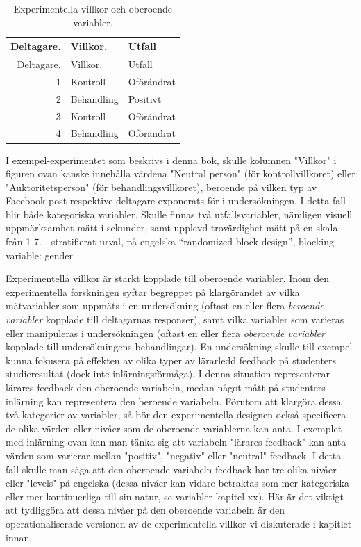 \documentclass[
]{book}
\begin{document}
\begin{longtable}[]{@{}rll@{}}
\caption{\label{tab:tab-02-07-4-2-01}Experimentella villkor och oberoende variabler.}\tabularnewline
\toprule
Deltagare. & Villkor. & Utfall\tabularnewline
\midrule
\endfirsthead
\toprule
Deltagare. & Villkor. & Utfall\tabularnewline
\midrule
\endhead
1 & Kontroll & Oförändrat\tabularnewline
2 & Behandling & Positivt\tabularnewline
3 & Kontroll & Oförändrat\tabularnewline
4 & Behandling & Oförändrat\tabularnewline
\bottomrule
\end{longtable}

I exempel-experimentet som beskrivs i denna bok, skulle kolumnen "Villkor" i figuren ovan kanske innehålla värdena "Neutral person" (för kontrollvillkoret) eller "Auktoritetsperson" (för behandlingsvillkoret), beroende på vilken typ av Facebook-post respektive deltagare exponerats för i undersökningen. I detta fall blir både kategoriska variabler. Skulle finnas två utfallsvariabler, nämligen visuell uppmärksamhet mätt i sekunder, samt upplevd trovärdighet mätt på en skala från 1-7. - stratifierat urval, på engelska ``randomized block design'', blocking variable: gender

Experimentella villkor är starkt kopplade till oberoende variabler. Inom den experimentella forskningen syftar begreppet på klargörandet av vilka mätvariabler som uppmäts i en undersökning (oftast en eller flera \emph{beroende variabler} kopplade till deltagarnas responser), samt vilka variabler som varieras eller manipuleras i undersökningen (oftast en eller flera \emph{oberoende variabler} kopplade till undersökningens behandlingar). En undersökning skulle till exempel kunna fokusera på effekten av olika typer av lärarledd feedback på studenters studieresultat (dock inte inlärningsförmåga). I denna situation representerar lärares feedback den oberoende variabeln, medan något mått på studenters inlärning kan representera den beroende variabeln. Förutom att klargöra dessa två kategorier av variabler, så bör den experimentella designen också specificera de olika värden eller nivåer som de oberoende variablerna kan anta. I exemplet med inlärning ovan kan man tänka sig att variabeln "lärares feedback" kan anta värden som varierar mellan "positiv", "negativ" eller "neutral" feedback. I detta fall skulle man säga att den oberoende variabeln feedback har tre olika nivåer eller "levels" på engelska (dessa nivåer kan vidare betraktas som mer kategoriska eller mer kontinuerliga till sin natur, se variabler kapitel xx). Här är det viktigt att tydliggöra att dessa nivåer på den oberoende variabeln är den operationaliserade versionen av de experimentella villkor vi diskuterade i kapitlet innan.
\end{document}
